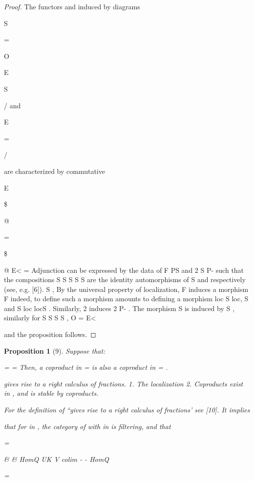 \documentclass[11pt,a4paper]{article}
\theoremstyle{plain}
\newtheorem{proposition}[theorem]{Proposition}
\theoremstyle{definition}
\begin{document}
\begin{proof} The functors  and  induced by
diagrams

S

=

 

O

E




S

/ and

E

= 

/

are characterized by commutative

E

 


\$

@

=




\$

@
E<  
=  
Adjunction can be expressed by the data of F PS and 2 S P- such
that the compositions
S S S S
S
are the identity automorphisms of S and respectively (see, e.g. [6]).
S  ,
By the universal property of localization, F induces a morphism F
indeed, to define such a morphism amounts to defining a morphism loc
S  loc,
 S
and S  loc
locS . Similarly, 2 induces 2
P- . The morphism
  S   is induced by
S
, similarly for S
S  S S ,
O
=  
E< 

and the proposition follows.



\end{proof}

\begin{proposition}[9]
Suppose that:

= 
= 
Then, a coproduct in = is also a coproduct in =  .

 gives rise to a right calculus of fractions.
1. The localization
2. Coproducts exist in , and is stable by coproducts.

For the definition of ``gives rise to a right calculus of fractions' see [10]. It implies

that for in , the category of
with in is filtering, and that

 =

\&   \& 
HomQ UK V    colim -  - HomQ     



 =

\end{proposition}
\end{document}
